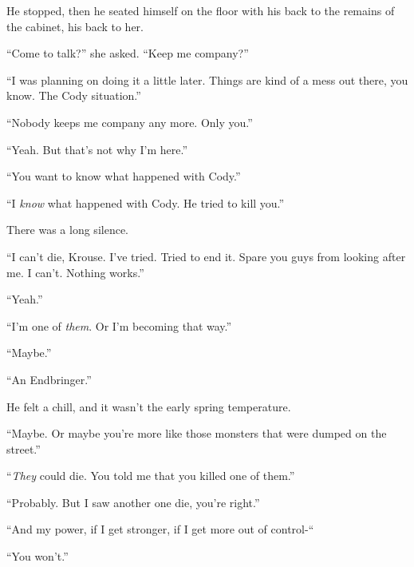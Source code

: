 He stopped, then he seated himself on the floor with his back to the remains of the cabinet, his back to her.



``Come to talk?'' she asked.  ``Keep me company?''



``I was planning on doing it a little later. Things are kind of a mess out there, you know.  The Cody situation.''



``Nobody keeps me company any more.  Only you.''



``Yeah.  But that's not why I'm here.''



``You want to know what happened with Cody.''



``I \emph{know} what happened with Cody.  He tried to kill you.''



There was a long silence.



``I can't die, Krouse.  I've tried.  Tried to end it.  Spare you guys from looking after me.  I can't.  Nothing works.''



``Yeah.''



``I'm one of \emph{them}.  Or I'm becoming that way.''



``Maybe.''



``An Endbringer.''



He felt a chill, and it wasn't the early spring temperature.



``Maybe.  Or maybe you're more like those monsters that were dumped on the street.''



``\emph{They} could die.  You told me that you killed one of them.''



``Probably.  But I saw another one die, you're right.''



``And my power, if I get stronger, if I get more out of control-``



``You won't.''



